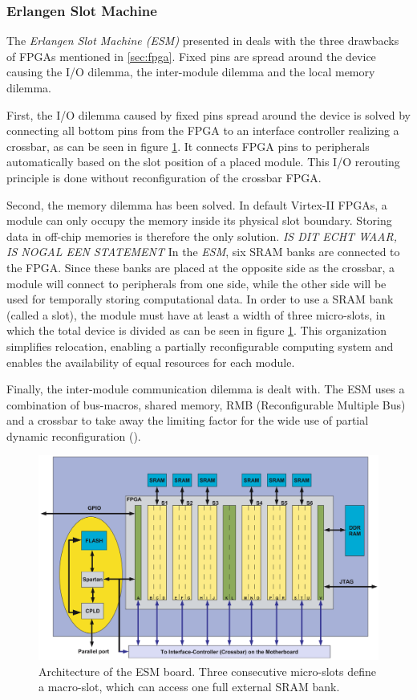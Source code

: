 \subsubsection{Erlangen Slot Machine}
The \emph{Erlangen Slot Machine (ESM)} presented in \cite{erlangen} deals with the three drawbacks of FPGAs mentioned in \ref{sec:fpga}. Fixed pins are spread around the device causing the I/O dilemma, the inter-module dilemma and the local memory dilemma. 

First, the I/O dilemma caused by fixed pins spread around the device is solved by connecting all bottom pins from the FPGA to an interface controller realizing a crossbar, as can be seen in figure \ref{fig:erlangen}. It connects FPGA pins to peripherals automatically based on the slot position of a placed module. This I/O rerouting principle is done without reconfiguration of the crossbar FPGA.

Second, the memory dilemma has been solved. In default Virtex-II FPGAs, a module can only occupy the memory inside its physical slot boundary. Storing data in off-chip memories is therefore the only solution. \emph{IS DIT ECHT WAAR, IS NOGAL EEN STATEMENT} In the \emph{ESM}, six SRAM banks are connected to the FPGA. Since these banks are placed at the opposite side as the crossbar, a module will connect to peripherals from one side, while the other side will be used for temporally storing computational data. In order to use a SRAM bank (called a slot), the module must have at least a width of three micro-slots, in which the total device is divided as can be seen in figure \ref{fig:erlangen}. This organization simplifies relocation, enabling a partially reconfigurable computing system and enables the availability of equal resources for each module.

Finally, the inter-module communication dilemma is dealt with. The ESM uses a combination of bus-macros, shared memory, RMB (Reconfigurable Multiple Bus) and a crossbar to take away the limiting factor for the wide use of partial dynamic reconfiguration (\cite{erlangen}).
\begin{figure}[htb]%
\includegraphics[width=\columnwidth]{Pictures/erlangen}%
\caption{Architecture of the ESM board. Three consecutive micro-slots define a macro-slot, which can access one full external SRAM bank.}%
\label{fig:erlangen}%
\end{figure}
